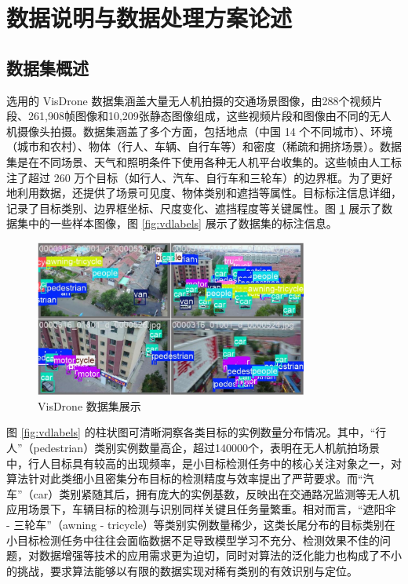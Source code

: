 \documentclass[runningheads]{llncs}
\begin{document}
\section{数据说明与数据处理方案论述}

\subsection{数据集概述}

选用的 VisDrone 数据集\cite{vd}涵盖大量无人机拍摄的交通场景图像，由288个视频片段、261,908帧图像和10,209张静态图像组成，这些视频片段和图像由不同的无人机摄像头拍摄。数据集涵盖了多个方面，包括地点（中国 14 个不同城市）、环境（城市和农村）、物体（行人、车辆、自行车等）和密度（稀疏和拥挤场景）。数据集是在不同场景、天气和照明条件下使用各种无人机平台收集的。这些帧由人工标注了超过 260 万个目标（如行人、汽车、自行车和三轮车）的边界框。为了更好地利用数据，还提供了场景可见度、物体类别和遮挡等属性。目标标注信息详细，记录了目标类别、边界框坐标、尺度变化、遮挡程度等关键属性。图 \ref{fig:vdshow} 展示了数据集中的一些样本图像，图 \ref{fig:vdlabels} 展示了数据集的标注信息。

\begin{figure}[htbp]
    \centering
    \includegraphics[width=0.8\textwidth]{../figure/VisDrone.png}
    \caption{VisDrone 数据集展示}
    \label{fig:vdshow}
\end{figure}

图 \ref{fig:vdlabels} 的柱状图可清晰洞察各类目标的实例数量分布情况。其中，“行人”（pedestrian）类别实例数量高企，超过140000个，表明在无人机航拍场景中，行人目标具有较高的出现频率，是小目标检测任务中的核心关注对象之一，对算法针对此类细小且密集分布目标的检测精度与效率提出了严苛要求。而“汽车”（car）类别紧随其后，拥有庞大的实例基数，反映出在交通路况监测等无人机应用场景下，车辆目标的检测与识别同样关键且任务量繁重。相对而言，“遮阳伞 - 三轮车”（awning - tricycle）等类别实例数量稀少，这类长尾分布的目标类别在小目标检测任务中往往会面临数据不足导致模型学习不充分、检测效果不佳的问题，对数据增强等技术的应用需求更为迫切，同时对算法的泛化能力也构成了不小的挑战，要求算法能够以有限的数据实现对稀有类别的有效识别与定位。
\end{document}
